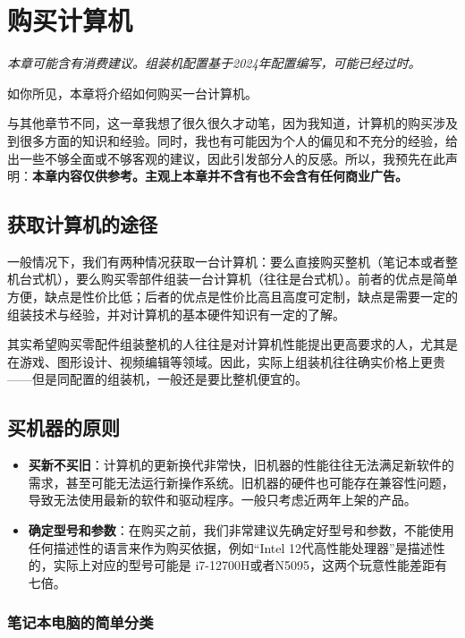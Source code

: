 \documentclass[../main.tex]{subfiles}
\begin{document}
\chapter{购买计算机}

\begin{flushright}
  \emph{本章可能含有消费建议。组装机配置基于2024年配置编写，可能已经过时。}
\end{flushright}

如你所见，本章将介绍如何购买一台计算机。

与其他章节不同，这一章我想了很久很久才动笔，因为我知道，计算机的购买涉及到很多方面的知识和经验。同时，我也有可能因为个人的偏见和不充分的经验，给出一些不够全面或不够客观的建议，因此引发部分人的反感。所以，我预先在此声明：\textbf{本章内容仅供参考。主观上本章并不含有也不会含有任何商业广告。}

\section{获取计算机的途径}

一般情况下，我们有两种情况获取一台计算机：要么直接购买整机（笔记本或者整机台式机），要么购买零部件组装一台计算机（往往是台式机）。前者的优点是简单方便，缺点是性价比低；后者的优点是性价比高且高度可定制，缺点是需要一定的组装技术与经验，并对计算机的基本硬件知识有一定的了解。

其实希望购买零配件组装整机的人往往是对计算机性能提出更高要求的人，尤其是在游戏、图形设计、视频编辑等领域。因此，实际上组装机往往确实价格上更贵——但是同配置的组装机，一般还是要比整机便宜的。

\section{买机器的原则}

\begin{itemize}
  \item \textbf{买新不买旧}：计算机的更新换代非常快，旧机器的性能往往无法满足新软件的需求，甚至可能无法运行新操作系统。旧机器的硬件也可能存在兼容性问题，导致无法使用最新的软件和驱动程序。一般只考虑近两年上架的产品。
  \item \textbf{确定型号和参数}：在购买之前，我们非常建议先确定好型号和参数，不能使用任何描述性的语言来作为购买依据，例如“Intel 12代高性能处理器”是描述性的，实际上对应的型号可能是 i7-12700H或者N5095，这两个玩意性能差距有七倍。
\end{itemize}

\subsection{笔记本电脑的简单分类}
\end{document}
